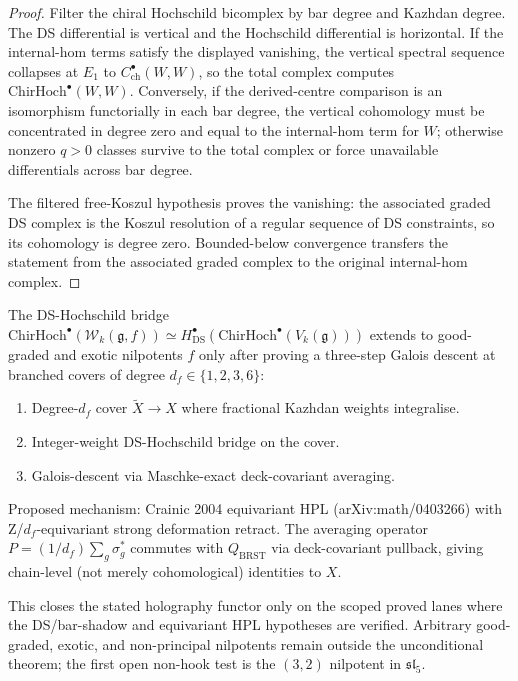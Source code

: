 \documentclass[11pt]{article}
\begin{document}
\begin{proof}
Filter the chiral Hochschild bicomplex by bar degree and Kazhdan
degree.  The DS differential is vertical and the Hochschild
differential is horizontal.  If the internal-hom terms satisfy
the displayed vanishing, the vertical spectral sequence collapses
at $E_1$ to $C^\bullet_{\mathrm{ch}}(W,W)$, so the total complex
computes $\mathrm{ChirHoch}^{\bullet}(W,W)$.  Conversely, if the
derived-centre comparison is an isomorphism functorially in each
bar degree, the vertical cohomology must be concentrated in
degree zero and equal to the internal-hom term for $W$; otherwise
nonzero $q>0$ classes survive to the total complex or force
unavailable differentials across bar degree.

The filtered free-Koszul hypothesis proves the vanishing: the
associated graded DS complex is the Koszul resolution of a
regular sequence of DS constraints, so its cohomology is degree
zero.  Bounded-below convergence transfers the statement from
the associated graded complex to the original internal-hom
complex.
\end{proof}

The DS-Hochschild bridge
$\mathrm{ChirHoch}^{\bullet}(\mathcal{W}_k(\mathfrak{g}, f)) \simeq
H^{\bullet}_{\mathrm{DS}}(\mathrm{ChirHoch}^{\bullet}(V_k(\mathfrak{g})))$
extends to good-graded and exotic nilpotents $f$ only after
proving a three-step Galois descent at branched covers of degree
$d_f \in \{1, 2, 3, 6\}$:
\begin{enumerate}
\item Degree-$d_f$ cover $\widetilde{X} \to X$ where fractional
Kazhdan weights integralise.
\item Integer-weight DS-Hochschild bridge on the cover.
\item Galois-descent via Maschke-exact deck-covariant averaging.
\end{enumerate}
Proposed mechanism: Crainic 2004 equivariant HPL (arXiv:math/0403266)
with Z/$d_f$-equivariant strong deformation retract. The averaging
operator $P = (1/d_f)\sum_{g} \sigma_g^*$ commutes with $Q_{\mathrm{BRST}}$
via deck-covariant pullback, giving chain-level (not merely
cohomological) identities to $X$.

This closes the stated holography functor only on the scoped
proved lanes where the DS/bar-shadow and equivariant HPL hypotheses
are verified.  Arbitrary good-graded, exotic, and non-principal
nilpotents remain outside the unconditional theorem; the first
open non-hook test is the $(3,2)$ nilpotent in $\mathfrak{sl}_5$.
\end{document}
